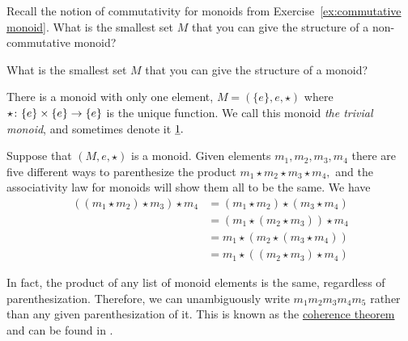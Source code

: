 \documentclass[CT4S-EN-RU]{subfiles}
\begin{document}
\begin{exerciseENG}
Recall the notion of commutativity for monoids from Exercise~\ref{ex:commutative monoid}.
\sexc What is the smallest set $M$ that you can give the structure of a non-commutative monoid?
\item What is the smallest set $M$ that you can give the structure of a monoid?
\endsexc
\end{exerciseENG}

\begin{exerciseRUS}
\end{exerciseRUS}

\begin{exampleENG}\label{ex:trivial monoid}
There is a monoid with only one element, $M=(\{e\},e,\star)$ where $\star\colon\{e\}\times\{e\}\rightarrow\{e\}$ is the unique function. We call this monoid {\em the trivial monoid}, and sometimes denote it $\underline{1}.$
\end{exampleENG}

\begin{exampleRUS}\label{ex:trivial monoid}
\end{exampleRUS}

\begin{exampleENG}
Suppose that $(M,e,\star)$ is a monoid. Given elements $m_1,m_2,m_3,m_4$ there are five different ways to parenthesize the product $m_1\star m_2\star m_3\star m_4,$ and the associativity law for monoids will show them all to be the same. We have
\begin{align*}
((m_1\star m_2)\star m_3)\star m_4&=(m_1\star m_2)\star (m_3\star m_4)\\
&=(m_1\star(m_2\star m_3))\star m_4\\
&=m_1\star(m_2\star (m_3\star m_4))\\
&=m_1\star((m_2\star m_3)\star m_4)
\end{align*}

In fact, the product of any list of monoid elements is the same, regardless of parenthesization. Therefore, we can unambiguously write $m_1m_2m_3m_4m_5$ rather than any given parenthesization of it. This is known as the \href{http://en.wikipedia.org/wiki/Coherence_theorem}{\text coherence theorem} and can be found in \cite{Mac}.
\end{exampleENG}

\begin{exampleRUS}
\end{exampleRUS}
\end{document}
